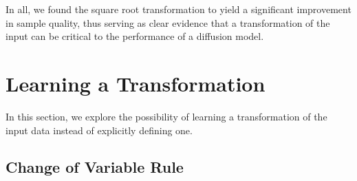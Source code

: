 \documentclass[ oneside,%
                    author={George Herbert},
                    degree={MSci},
                     title={Video Diffusion Models for Climate Simulations},
                  subtitle={}]{dissertation}
\begin{document}
In all, we found the square root transformation to yield a significant improvement in sample quality, thus serving as clear evidence that a transformation of the input can be critical to the performance of a diffusion model.

\section{Learning a Transformation}
\label{sec:results_learning_transformation}

In this section, we explore the possibility of learning a transformation of the input data instead of explicitly defining one.

\subsection{Change of Variable Rule}
\label{sec:results_change_of_variable}
\end{document}
